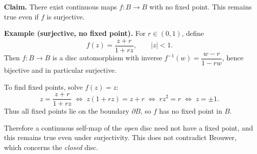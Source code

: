 \begin{solution}
\noindent\textbf{Claim.} There exist continuous maps \(f:B\to B\) with no fixed point.
This remains true even if \(f\) is surjective.

\smallskip

\noindent\textbf{Example (surjective, no fixed point).}
For \(r\in(0,1)\), define
\[
f(z)=\frac{z+r}{1+rz},\qquad |z|<1 .
\]
Then \(f:B\to B\) is a disc automorphism with inverse
\(f^{-1}(w)=\dfrac{w-r}{1-rw}\), hence bijective and in particular surjective.

To find fixed points, solve \(f(z)=z\):
\[
z=\frac{z+r}{1+rz}
\;\Longleftrightarrow\;
z(1+rz)=z+r
\;\Longleftrightarrow\;
r z^2=r
\;\Longleftrightarrow\;
z=\pm 1 .
\]
Thus all fixed points lie on the boundary \(\partial B\), so \(f\) has no fixed point in \(B\).

\smallskip

Therefore a continuous self-map of the \emph{open} disc need not have a fixed point,
and this remains true even under surjectivity.
This does not contradict Brouwer, which concerns the \emph{closed} disc.

\smallskip
\end{solution}

